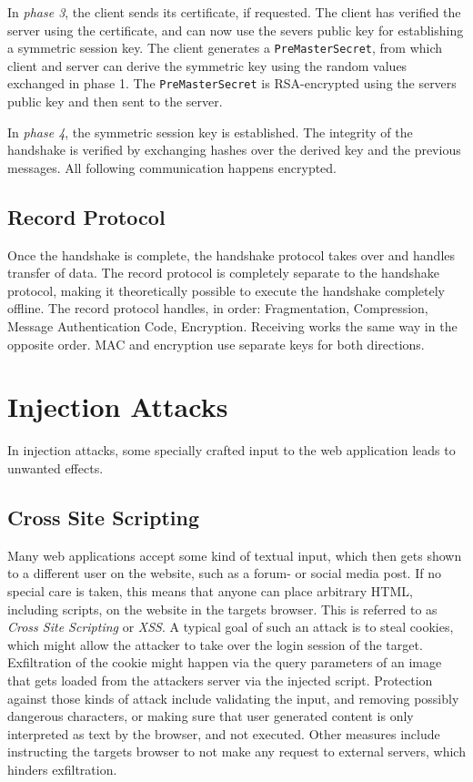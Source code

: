 In \emph{phase 3}, the client sends its certificate, if requested. The client
has verified the server using the certificate, and can now use the severs public
key for establishing a symmetric session key. The client generates a
\texttt{PreMasterSecret}, from which client and server can derive the symmetric
key using the random values exchanged in phase 1. The \texttt{PreMasterSecret}
is RSA-encrypted using the servers public key and then sent to the server.

In \emph{phase 4}, the symmetric session key is established. The integrity of
the handshake is verified by exchanging hashes over the derived key and the
previous messages. All following communication happens encrypted.

\subsection{Record Protocol}
Once the handshake is complete, the handshake protocol takes over and handles
transfer of data. The record protocol is completely separate to the handshake
protocol, making it theoretically possible to execute the handshake completely
offline. The record protocol handles, in order: Fragmentation, Compression,
Message Authentication Code, Encryption. Receiving works the same way in the
opposite order. MAC and encryption use separate keys for both directions.

\section{Injection Attacks}
In injection attacks, some specially crafted input to the web application leads
to unwanted effects.

\subsection{Cross Site Scripting}
Many web applications accept some kind of textual input, which then gets shown
to a different user on the website, such as a forum- or social media post. If no
special care is taken, this means that anyone can place arbitrary HTML,
including scripts, on the website in the targets browser. This is referred to as
\textit{Cross Site Scripting} or \emph{XSS}. A typical goal of such an attack is
to steal cookies, which might allow the attacker to take over the login session
of the target. Exfiltration of the cookie might happen via the query parameters
of an image that gets loaded from the attackers server via the injected script.
Protection against those kinds of attack include validating the input, and
removing possibly dangerous characters, or making sure that user generated
content is only interpreted as text by the browser, and not executed. Other
measures include instructing the targets browser to not make any request to
external servers, which hinders exfiltration.


